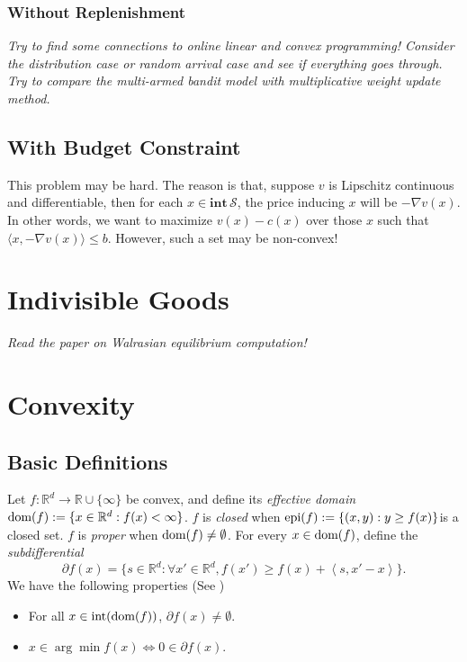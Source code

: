\documentclass{article}
\def\R{\mathbb R}
\def\int{\textup{int}}
\def\epi{\textup{epi}}
\def\dom{\textup{dom}}
\newcommand{\ip}[2]{\left\langle #1, #2 \right \rangle}
\begin{document}
\subsubsection{Without Replenishment}
\textsl{Try to find some connections to online linear and convex programming! Consider the distribution case or random arrival case and see if everything goes through. Try to compare the multi-armed bandit model with multiplicative weight update method.}

\subsection{With Budget Constraint}
This problem may be hard. The reason is that, suppose $v$ is Lipschitz continuous and differentiable, then for each $x\in \mathbf{int}\,\mathcal{S}$, the price inducing $x$ will be $-\nabla v(x)$. In other words, we want to maximize $v(x)-c(x)$ over those $x$ such that $\langle x,-\nabla v(x)\rangle\le b$. However, such a set may be non-convex!

\section{Indivisible Goods}
\textsl{Read the paper on Walrasian equilibrium computation!}

\appendix
\section{Convexity}
\subsection{Basic Definitions}
Let $f : \R^d\to\R\cup \{\infty\}$ be convex, and define its \emph{effective domain} $\dom(f) := \{x \in\R^d : f(x) < \infty\}$.
$f$ is \emph{closed} when $\epi(f) := \{ (x,y) : y\geq f(x)\}$is a closed set.
$f$ is \emph{proper} when $\dom(f)\ne\emptyset$.
For every $x\in\dom(f)$, define the \emph{subdifferential}
\begin{equation}\label{subDiff}
    \partial f(x) = \{s\in\R^d : \forall x'\in\R^d, f(x') \geq f(x) + \ip{s}{x'-x}\}.
\end{equation}
We have the following properties (See \citep[Theorem 3.1.13, Theorem 3.1.15]{N13})
\begin{itemize}
    \item For all $x\in\int(\dom(f))$, $\partial f(x)\ne\emptyset$.
    \item $x\in\arg\min f(x)\iff0\in\partial f(x)$.
\end{itemize}
\end{document}
